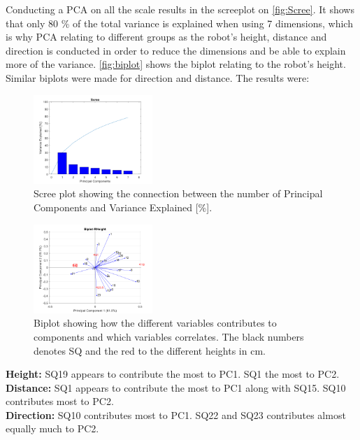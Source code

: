 \noindent
Conducting a PCA on all the scale results in the screeplot on \autoref{fig:Scree}. It shows that only 80 \% of the total variance is explained when using 7 dimensions, which is why PCA relating to different groups as the robot's height, distance and direction is conducted in order to reduce the dimensions and be able to explain more of the variance. \autoref{fig:biplot} shows the biplot relating to the robot's height. Similar biplots were made for direction and distance. The results were:
%
\begin{figure}
	\centering
	\includegraphics[width = 0.40\textwidth]{Figure/Scree.png}
	\setlength{} 
	\caption{Scree plot showing the connection between the number of Principal Components and Variance Explained [\%].}
	\label{fig:Scree}
\end{figure}
\noindent

%
\begin{figure}
	\centering
	\includegraphics[width = 0.40\textwidth]{Figure/RHeight-Biplot.png}
	\setlength{} 
	\caption{Biplot showing how the different variables contributes to components and which variables correlates. The black numbers denotes SQ and the red to the different heights in cm.}
	\label{fig:biplot}
\end{figure}
\noindent
%
\textbullet \textbf{Height:} SQ19 appears to contribute the most to PC1. SQ1 the most to PC2. \\
\textbullet \textbf{Distance:} SQ1 appears to contribute the most to PC1 along with SQ15. SQ10 contributes most to PC2.\\
\textbullet \textbf{Direction:} SQ10 contributes most to PC1. SQ22 and SQ23 contributes almost equally much to PC2.\\

